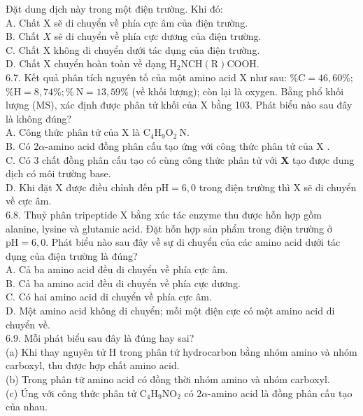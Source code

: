 \documentclass[10pt]{article}
\begin{document}
Đặt dung dịch này trong một điện trường. Khi đó:\\
A. Chất X sẽ di chuyển về phía cực âm của điện trường.\\
B. Chất $X$ sẽ di chuyển về phía cực dương của điện trường.\\
C. Chất X không di chuyển dưới tác dụng của điện trường.\\
D. Chất X chuyển hoàn toàn về dạng $\mathrm{H}_{2} \mathrm{NCH}(\mathrm{R}) \mathrm{COOH}$.\\
6.7. Kết quả phân tích nguyên tố của một amino acid X như sau: $\% \mathrm{C}=46,60 \%$; $\% \mathrm{H}=8,74 \% ; \% \mathrm{~N}=13,59 \%$ (về khối lượng); còn lại là oxygen. Bằng phổ khối lượng (MS), xác định được phân tử khối của X bằng 103. Phát biểu nào sau đây là không đúng?\\
A. Công thức phân tử của X là $\mathrm{C}_{4} \mathrm{H}_{9} \mathrm{O}_{2} \mathrm{~N}$.\\
B. Có $2 \alpha$-amino acid đồng phân cấu tạo ứng với công thức phân tử của X .\\
C. Có 3 chất đồng phân cấu tạo có cùng công thức phân tử với $\mathbf{X}$ tạo được dung dịch có môi trường base.\\
D. Khi đặt X được điều chỉnh đến $\mathrm{pH}=6,0$ trong điện trường thì X sẽ di chuyển về cực âm.\\
6.8. Thuỷ phân tripeptide X bằng xúc tác enzyme thu được hỗn hợp gồm alanine, lysine và glutamic acid. Đặt hỗn hợp sản phẩm trong điện trường ở $\mathrm{pH}=6,0$. Phát biểu nào sau đây về sự di chuyển của các amino acid dưới tác dụng của điện trường là đúng?\\
A. Cả ba amino acid đều di chuyển về phía cực âm.\\
B. Cả ba amino acid đều di chuyển về phía cực dương.\\
C. Có hai amino acid di chuyển về phía cực âm.\\
D. Một amino acid không di chuyển; mỗi một điện cực có một amino acid di chuyển về.\\
6.9. Mỗi phát biểu sau đây là đúng hay sai?\\
(a) Khi thay nguyên tử H trong phân tử hydrocarbon bằng nhóm amino và nhóm carboxyl, thu được hợp chất amino acid.\\
(b) Trong phân tữ amino acid có đồng thời nhóm amino và nhóm carboxyl.\\
(c) Úng với công thức phân tử $\mathrm{C}_{4} \mathrm{H}_{9} \mathrm{NO}_{2}$ có $2 \alpha$-amino acid là đồng phân cấu tạo của nhau.\\
\end{document}
